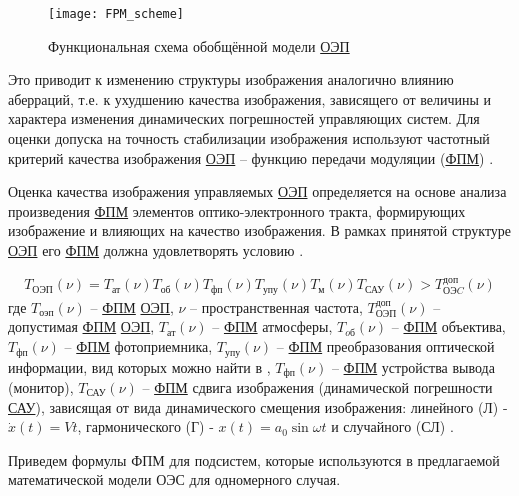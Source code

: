 \begin{figure}[ht]
	\centering
	\texttt{[image: FPM\_scheme]} 
	\caption{Функциональная схема обобщённой модели \hyperref[acroEOS]{ОЭП}}
	\label{fig:oep_sch}
\end{figure}

Это приводит к изменению структуры изображения аналогично влиянию аберраций, т.е. к ухудшению качества изображения, зависящего от величины и характера изменения динамических погрешностей управляющих систем. Для оценки допуска на точность стабилизации изображения используют частотный критерий качества изображения \hyperref[acroEOS]{ОЭП} – функцию передачи модуляции (\hyperref[acroFPM]{ФПМ}) \cite[]{Tarasov}.

Оценка качества изображения управляемых \hyperref[acroEOS]{ОЭП} определяется на основе анализа произведения \hyperref[acroFPM]{ФПМ} элементов оптико-электронного тракта, формирующих изображение и влияющих на качество изображения. В рамках принятой структуре \hyperref[acroEOS]{ОЭП} его \hyperref[acroFPM]{ФПМ} должна удовлетворять условию \cite[]{Ivanov18,Molin21}.

\begin{equation}
\label{eq:p2:2.5}
\begin{alignedat}{2}
T_{\textit{ОЭП}}( \nu )=
T_{\textit{ат}}(\nu)T_{\textit{об}}(\nu)T_{\textit{фп}}(\nu)T_{\textit{упу}}(\nu)T_{\textit{м}}(\nu)
T_{\textit{САУ}}(\nu)>T_{\textit{ОЭC}}^{\textit{доп}}(\nu)
\end{alignedat}
\end{equation}
где 
$T_{\textit{оэп}}(\nu)$ – \hyperref[acroFPM]{ФПМ} \hyperref[acroEOS]{ОЭП}, 
$\nu$ – пространственная частота, 
$T_{\textit{ОЭП}}^{\textit{доп}}(\nu)$ – допустимая \hyperref[acroFPM]{ФПМ} \hyperref[acroEOS]{ОЭП}, 
$T_\textit{ат}(\nu)$ – \hyperref[acroFPM]{ФПМ} атмосферы, 
$T_\textit{oб}(\nu)$ – \hyperref[acroFPM]{ФПМ} объектива, 
$T_\textit{фп}(\nu)$ – \hyperref[acroFPM]{ФПМ} фотоприемника, 
$T_\textit{упу}(\nu)$ – \hyperref[acroFPM]{ФПМ} преобразования оптической информации, вид которых можно найти в \cite[]{Tarasov},
$T_\textit{фп}(\nu)$ – \hyperref[acroFPM]{ФПМ} устройства вывода (монитор), 
$T_{\textit{САУ}}(\nu)$ – \hyperref[acroFPM]{ФПМ} сдвига изображения (динамической погрешности \hyperref[acroSAU]{САУ}), зависящая от вида динамического смещения изображения: линейного (Л) - $\dot{x}(t) = Vt$, 
гармонического (Г) - $x(t)=a_{0}\sin{\omega t}$ и 
случайного (СЛ) \cite{Tarasov,Sokolski22}.

Приведем формулы ФПМ для подсистем, которые используются в предлагаемой математической модели ОЭС для одномерного случая.

